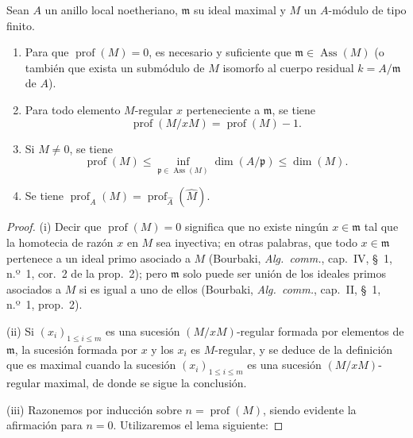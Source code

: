 \begin{proposition}[16.4.6]
\label{0.16.4.6-es}
Sean $A$ un anillo local noetheriano, $\mathfrak{m}$ su ideal maximal y $M$ un
$A$-módulo de tipo finito.
\begin{enumerate}
  \item[\rm{(i)}] Para que $\operatorname{prof}(M)=0$, es necesario y
  suficiente que $\mathfrak{m}\in\operatorname{Ass}(M)$ \textup{(o también que exista
  un submódulo de $M$ isomorfo al cuerpo residual $k=A/\mathfrak{m}$ de $A$)}.
  \item[\rm{(ii)}] Para todo elemento $M$-regular $x$ perteneciente a
  $\mathfrak{m}$, se tiene
  \begin{equation}
  \label{0.16.4.6.1-es}
  \tag{16.4.6.1}
    \operatorname{prof}(M/xM)=\operatorname{prof}(M)-1.
  \end{equation}
  \item[\rm{(iii)}] Si $M\neq0$, se tiene
  \begin{equation}
  \label{0.16.4.6.2-es}
  \tag{16.4.6.2}
    \operatorname{prof}(M)
    \leq\inf_{\mathfrak{p}\in\operatorname{Ass}(M)}\dim(A/\mathfrak{p})
    \leq\dim(M).
  \end{equation}
  \item[\rm{(iv)}] Se tiene
  $\operatorname{prof}_A(M)=
  \operatorname{prof}_{\widehat{A}}(\widehat{M})$.
\end{enumerate}
\end{proposition}

\begin{proof}
(i) Decir que $\operatorname{prof}(M)=0$ significa que no existe ningún
$x\in\mathfrak{m}$ tal que la homotecia de razón $x$ en $M$ sea inyectiva; en
otras palabras, que todo $x\in\mathfrak{m}$ pertenece a un ideal primo
asociado a $M$ (Bourbaki, \emph{Alg.~comm.}, cap.~IV, \S~1, n.º~1, cor.~2 de
la prop.~2); pero $\mathfrak{m}$ solo puede ser unión de los ideales primos
asociados a $M$ si es igual a uno de ellos (Bourbaki,
\emph{Alg.~comm.}, cap.~II, \S~1, n.º~1, prop.~2).

(ii) Si $(x_i)_{1\leq i\leq m}$ es una sucesión $(M/xM)$-regular formada por
elementos de $\mathfrak{m}$, la sucesión formada por $x$ y los $x_i$ es
$M$-regular, y se deduce de la definición que es maximal cuando la sucesión
$(x_i)_{1\leq i\leq m}$ es una sucesión $(M/xM)$-regular maximal, de donde se
sigue la conclusión.

(iii) Razonemos por inducción sobre $n=\operatorname{prof}(M)$, siendo evidente
la afirmación para $n=0$. Utilizaremos el lema siguiente:
\end{proof}

